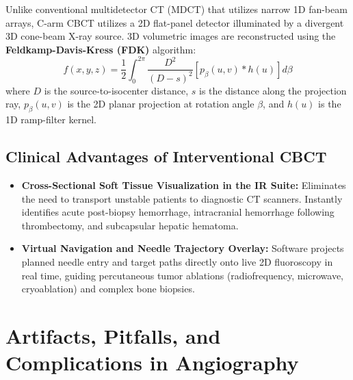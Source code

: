 \documentclass[11pt,a4paper]{article}
\begin{document}
Unlike conventional multidetector CT (MDCT) that utilizes narrow 1D fan-beam arrays, C-arm CBCT utilizes a 2D flat-panel detector illuminated by a divergent 3D cone-beam X-ray source. 3D volumetric images are reconstructed using the \textbf{Feldkamp-Davis-Kress (FDK)} algorithm:
\begin{equation}
    f(x,y,z) = \frac{1}{2} \int_0^{2\pi} \frac{D^2}{(D - s)^2} \left[ p_\beta(u,v) * h(u) \right] d\beta
\end{equation}
where $D$ is the source-to-isocenter distance, $s$ is the distance along the projection ray, $p_\beta(u,v)$ is the 2D planar projection at rotation angle $\beta$, and $h(u)$ is the 1D ramp-filter kernel.

\subsection{Clinical Advantages of Interventional CBCT}
\begin{itemize}[leftmargin=*]
    \item \textbf{Cross-Sectional Soft Tissue Visualization in the IR Suite:} Eliminates the need to transport unstable patients to diagnostic CT scanners. Instantly identifies acute post-biopsy hemorrhage, intracranial hemorrhage following thrombectomy, and subcapsular hepatic hematoma.
    \item \textbf{Virtual Navigation and Needle Trajectory Overlay:} Software projects planned needle entry and target paths directly onto live 2D fluoroscopy in real time, guiding percutaneous tumor ablations (radiofrequency, microwave, cryoablation) and complex bone biopsies.
\end{itemize}

\newpage
\section{Artifacts, Pitfalls, and Complications in Angiography}
\end{document}
